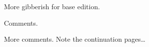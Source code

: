 \documentclass{book}
\begin{document}
More gibberish for base edition.

\lipsum[15-17]

\begin{commeditComments}
  Comments.
  \kant[4]
\end{commeditComments}

\lipsum[3-2]

\begin{commeditComments}
  More comments.  Note the continuation pages\ldots
  \kant[8-20]
\end{commeditComments}

\lipsum[9-20]
\end{document}

